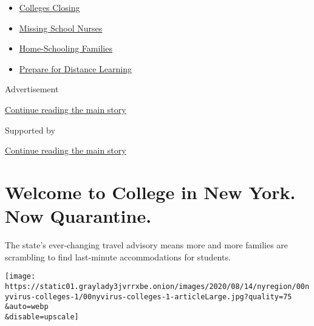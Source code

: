 \begin{itemize}
\tightlist
\item
  \href{https://www.nytimes3xbfgragh.onion/2020/08/19/us/colleges-closing-covid.html?name=styln-coronavirus-schools-reopening\&region=TOP_BANNER\&variant=undefined\&block=storyline_menu_recirc\&action=click\&pgtype=Article\&impression_id=01f353c1-e3ae-11ea-b830-1145750edefc}{Colleges
  Closing}
\item
  \href{https://www.nytimes3xbfgragh.onion/2020/08/20/us/schools-reopening-nurses-covid.html?name=styln-coronavirus-schools-reopening\&region=TOP_BANNER\&variant=undefined\&block=storyline_menu_recirc\&action=click\&pgtype=Article\&impression_id=01f353c2-e3ae-11ea-b830-1145750edefc}{Missing
  School Nurses}
\item
  \href{https://www.nytimes3xbfgragh.onion/2020/08/18/parenting/homeschool-families.html?name=styln-coronavirus-schools-reopening\&region=TOP_BANNER\&variant=undefined\&block=storyline_menu_recirc\&action=click\&pgtype=Article\&impression_id=01f37ad0-e3ae-11ea-b830-1145750edefc}{Home-Schooling
  Families}
\item
  \href{https://www.nytimes3xbfgragh.onion/2020/08/05/parenting/parents-distance-learning.html?name=styln-coronavirus-schools-reopening\&region=TOP_BANNER\&variant=undefined\&block=storyline_menu_recirc\&action=click\&pgtype=Article\&impression_id=01f37ad1-e3ae-11ea-b830-1145750edefc}{Prepare
  for Distance Learning}
\end{itemize}

Advertisement

\protect\hyperlink{after-top}{Continue reading the main story}

Supported by

\protect\hyperlink{after-sponsor}{Continue reading the main story}

\hypertarget{welcome-to-college-in-new-york-now-quarantine}{%
\section{Welcome to College in New York. Now
Quarantine.}\label{welcome-to-college-in-new-york-now-quarantine}}

The state's ever-changing travel advisory means more and more families
are scrambling to find last-minute accommodations for students.

\texttt{[image: https://static01.graylady3jvrrxbe.onion/images/2020/08/14/nyregion/00nyvirus-colleges-1/00nyvirus-colleges-1-articleLarge.jpg?quality=75\\\&auto=webp\\\&disable=upscale]}

